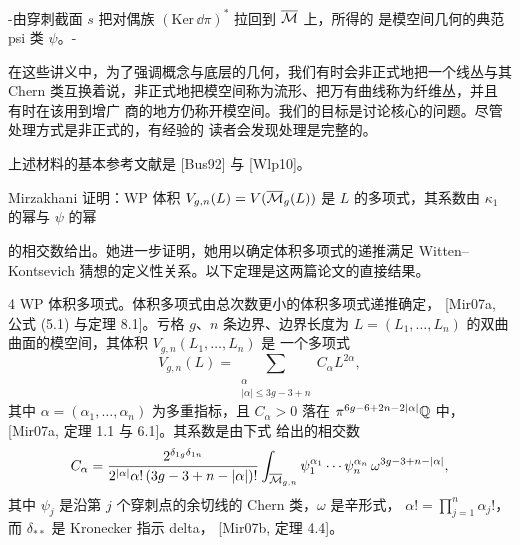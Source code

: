 -由穿刺截面 $s$ 把对偶族 $(\mathrm{Ker}\,\dd\pi)^*$ 拉回到 $\overline{\mathcal{M}}$ 上，所得的
是模空间几何的典范 psi 类 $\psi$。-


在这些讲义中，为了强调概念与底层的几何，我们有时会非正式地把一个线丛与其 Chern
类互换着说，非正式地把模空间称为流形、把万有曲线称为纤维丛，并且有时在该用到增广
商的地方仍称开模空间。我们的目标是讨论核心的问题。尽管处理方式是非正式的，有经验的
读者会发现处理是完整的。

上述材料的基本参考文献是 [Bus92] 与 [Wlp10]。


Mirzakhani 证明：WP 体积 $V_{g,n}(L)=V(\overline{\mathcal{M}}_g(L))$ 是 $L$ 的多项式，其系数由
$\kappa_1$ 的幂与 $\psi$ 的幂

的相交数给出。她进一步证明，她用以确定体积多项式的递推满足
Witten--Kontsevich 猜想的定义性关系。以下定理是这两篇论文的直接结果。

\begin{thm}{4} WP 体积多项式。体积多项式由总次数更小的体积多项式递推确定，
[Mir07a, 公式 (5.1) 与定理 8.1]。亏格 $g$、$n$ 条边界、边界长度为
$L=(L_1,\dots,L_n)$ 的双曲曲面的模空间，其体积 $V_{g,n}(L_1,\dots,L_n)$ 是
一个多项式
\[
V_{g,n}(L)=\sum_{\substack{\alpha\\ |\alpha|\le 3g-3+n}}C_\alpha L^{2\alpha},
\]
其中 $\alpha=(\alpha_1,\dots,\alpha_n)$ 为多重指标，且 $C_\alpha>0$ 落在
$\pi^{6g-6+2n-2|\alpha|}\mathbb{Q}$ 中，[Mir07a, 定理 1.1 与 6.1]。其系数是由下式
给出的相交数
\[
C_\alpha=\frac{2^{\delta_{1g}\delta_{1n}}}{2^{|\alpha|}\alpha!\,(3g-3+n-|\alpha|)!}
\int_{\overline{\mathcal{M}}_{g,n}}\psi_1^{\alpha_1}\cdots\psi_n^{\alpha_n}\,\omega^{3g-3+n-|\alpha|},
\]
其中 $\psi_j$ 是沿第 $j$ 个穿刺点的余切线的 Chern 类，$\omega$ 是辛形式，
$\alpha!=\prod_{j=1}^n\alpha_j!$，而 $\delta_{**}$ 是 Kronecker 指示 delta，
[Mir07b, 定理 4.4]。\end{thm}


